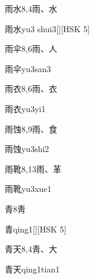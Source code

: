 \begin{entry}{雨水}{8,4}{⾬、⽔}
  \begin{phonetics}{雨水}{yu3 shui3}[][HSK 5]
  \end{phonetics}
\end{entry}

\begin{entry}{雨伞}{8,6}{⾬、⼈}
  \begin{phonetics}{雨伞}{yu3san3}
  \end{phonetics}
\end{entry}

\begin{entry}{雨衣}{8,6}{⾬、⾐}
  \begin{phonetics}{雨衣}{yu3yi1}
  \end{phonetics}
\end{entry}

\begin{entry}{雨蚀}{8,9}{⾬、⾷}
  \begin{phonetics}{雨蚀}{yu3shi2}
  \end{phonetics}
\end{entry}

\begin{entry}{雨靴}{8,13}{⾬、⾰}
  \begin{phonetics}{雨靴}{yu3xue1}
  \end{phonetics}
\end{entry}

\begin{entry}{青}{8}{⾭}
  \begin{phonetics}{青}{qing1}[][HSK 5]
  \end{phonetics}
\end{entry}

\begin{entry}{青天}{8,4}{⾭、⼤}
  \begin{phonetics}{青天}{qing1tian1}
  \end{phonetics}
\end{entry}

